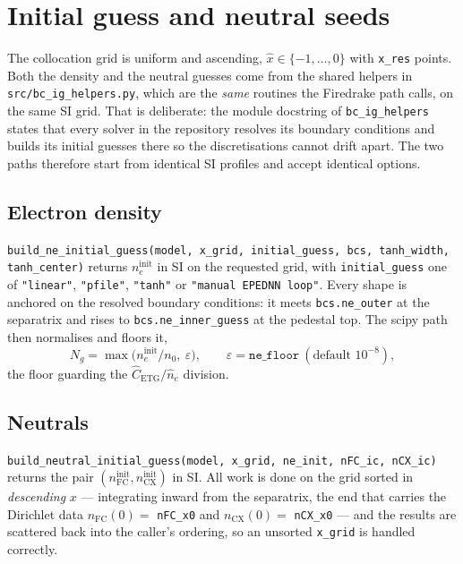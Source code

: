 \documentclass[11pt]{article}
\newcommand{\hn}{\hat{n}}
\newcommand{\hx}{\hat{x}}
\newcommand{\code}[1]{\texttt{#1}}
\begin{document}
\section{Initial guess and neutral seeds}
\label{sec:guess}

The collocation grid is uniform and ascending,
$\hx \in \{-1, \dots, 0\}$ with \code{x\_res} points.  Both the density
and the neutral guesses come from the shared helpers in
\code{src/bc\_ig\_helpers.py}, which are the \emph{same} routines the
Firedrake path calls, on the same SI grid.  That is deliberate: the
module docstring of \code{bc\_ig\_helpers} states that every solver in
the repository resolves its boundary conditions and builds its initial
guesses there so the discretisations cannot drift apart.  The two
paths therefore start from identical SI profiles and accept identical
options.

\subsection{Electron density}

\code{build\_ne\_initial\_guess(model, x\_grid, initial\_guess, bcs,
tanh\_width, tanh\_center)} returns $n_e^{\mathrm{init}}$ in SI on the
requested grid, with \code{initial\_guess} one of \code{"linear"},
\code{"pfile"}, \code{"tanh"} or \code{"manual EPEDNN loop"}.  Every
shape is anchored on the resolved boundary conditions: it meets
\code{bcs.ne\_outer} at the separatrix and rises to
\code{bcs.ne\_inner\_guess} at the pedestal top.  The scipy path then
normalises and floors it,
\begin{equation}
  N_g = \max\bigl(n_e^{\mathrm{init}}/n_0,\ \varepsilon\bigr),
  \qquad \varepsilon = \code{ne\_floor}\ (\text{default } 10^{-8}),
\end{equation}
the floor guarding the $\hat{C}_{\mathrm{ETG}}/\hn_e$ division.

\subsection{Neutrals}
\label{sec:neutralguess}

\code{build\_neutral\_initial\_guess(model, x\_grid, ne\_init, nFC\_ic,
nCX\_ic)} returns the pair $(n_{\mathrm{FC}}^{\mathrm{init}},
n_{\mathrm{CX}}^{\mathrm{init}})$ in SI.  All work is done on the grid
sorted in \emph{descending} $x$ --- integrating inward from the
separatrix, the end that carries the Dirichlet data
$n_{\mathrm{FC}}(0) = $ \code{nFC\_x0} and $n_{\mathrm{CX}}(0) = $
\code{nCX\_x0} --- and the results are scattered back into the caller's
ordering, so an unsorted \code{x\_grid} is handled correctly.
\end{document}

